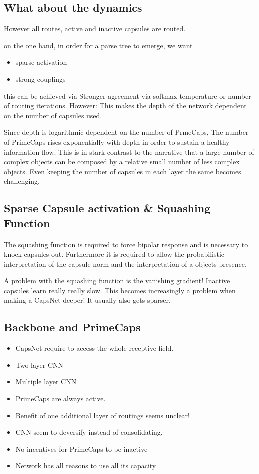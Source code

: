\documentclass{article}
\begin{document}
\subsection{What about the dynamics}


However all routes, active and inactive capsules are routed.

on the one hand, in order for a parse tree to emerge, we want
\begin{itemize}
	\item sparse activation
	\item strong couplings
\end{itemize}
this can be achieved via Stronger agreement via softmax temperature or number of routing iterations.
However: This makes the depth of the network dependent on the number of capsules used.


Since depth is logarithmic dependent on the number of PrmeCaps, The number of PrimeCaps rises exponentially with depth in order to sustain a healthy information flow. This is in stark contrast to the narrative that a large number of complex objects can be composed by a relative small number of less complex objects.
Even keeping the number of capsules in each layer the same becomes challenging.

\subsection{Sparse Capsule activation \& Squashing Function}
The squashing function is required to force bipolar response and is necessary to knock capsules out. Furthermore it is required to allow the probabilistic interpretation of the capsule norm and the interpretation of a objects presence.

A problem with the squashing function is the vanishing gradient!
Inactive capsules learn really really slow. This becomes increasingly a problem when making a CapsNet deeper! It usually also gets sparser.

\subsection{Backbone and PrimeCaps}
\begin{itemize}
	\item CapsNet require to access the whole receptive field.
	\item Two layer CNN
	\item Multiple layer CNN
	\item PrimeCaps are always active.
	\item Benefit of one additional layer of routings seems unclear!
	\item CNN seem to deversify instead of consolidating.
	\item No incentives for PrimeCaps to be inactive
	\item Network has all reasons to use all its capacity
\end{itemize}
\end{document}
